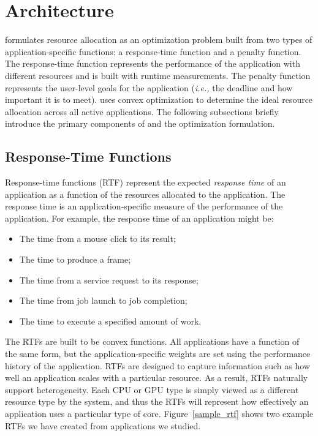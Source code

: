 \section{\pacora Architecture}\label{sys_design}
\pacora formulates resource allocation as an optimization problem
built from two types of application-specific functions: a
response-time function and a penalty function. The response-time
function represents the performance of the application with different
resources and is built with runtime measurements.  The penalty
function represents the user-level goals for the application
(\emph{i.e.,} the deadline and how important it is to meet). \pacora uses convex optimization\cite{BoVa} to
determine the ideal resource allocation across all active
applications.  The following subsections briefly introduce the primary
components of \pacora and the optimization formulation.

\subsection{Response-Time Functions}

Response-time functions (RTF) represent the expected \emph{response
  time} of an application as a function of the resources allocated to
the application. The response time is an application-specific measure
of the performance of the application.  For example, the response time
of an application might be:
    \begin{itemize}\itemsep0pt \parskip0pt 
    \item The time from a mouse click to its result;
    \item The time to produce a frame;
    \item The time from a service request to its response;
    \item The time from job launch to job completion;
    \item The time to execute a specified amount of work.
    \end{itemize}

The RTFs are built to be convex functions.  All applications have a
function of the same form, but the application-specific weights are set
using the performance history of the application.  RTFs are designed
to capture information such as how well an application scales with a
particular resource. As a result, RTFs naturally support
heterogeneity.  Each CPU or GPU type is simply viewed as a different
resource type by the system, and thus the RTFs will represent how
effectively an application uses a particular type of
core. Figure~\ref{sample_rtf} shows two example RTFs we have created
from applications we studied.


